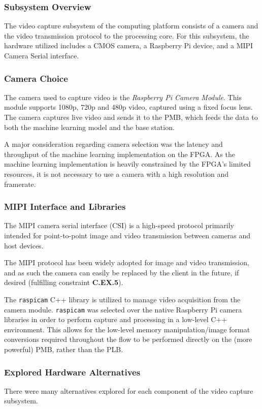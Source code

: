 \subsubsection{Subsystem Overview}
The video capture subsystem of the computing platform consists of a camera and the video transmission protocol to the processing core. For this subsystem, the hardware utilized includes a CMOS camera, a Raspberry Pi device, and a MIPI Camera Serial interface. 

\subsubsection{Camera Choice}
The camera used to capture video is the \textit{Raspberry Pi Camera Module}. This module supports 1080p, 720p and 480p video, captured using a fixed focus lens. The camera captures live video and sends it to the PMB, which feeds the data to both the machine learning model and the base station.

A major consideration regarding camera selection was the latency and throughput of the machine learning implementation on the FPGA. As the machine learning implementation is heavily constrained by the FPGA's limited resources, it is not necessary to use a camera with a high resolution and framerate.

\subsubsection{MIPI Interface and Libraries}
The MIPI camera serial interface (CSI) is a high-speed protocol primarily intended for point-to-point image and video transmission between cameras and host devices. 

The MIPI protocol has been widely adopted for image and video transmission, and as such the camera can easily be replaced by the client in the future, if desired (fulfilling constraint \textbf{C.EX.5}).

The \texttt{raspicam} C++ library is utilized to manage video acquisition from the camera module. \texttt{raspicam} was selected over the native Raspberry Pi camera libraries in order to perform capture and processing in a low-level C++ environment. This allows for the low-level memory manipulation/image format conversions required throughout the flow to be performed directly on the (more powerful) PMB, rather than the PLB.

\subsubsection{Explored Hardware Alternatives}
There were many alternatives explored for each component of the video capture subsystem.

